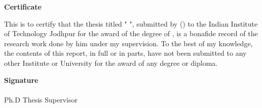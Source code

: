 \setmainfont[ Path = font/,
 BoldFont={CandaraBI}, 
 ItalicFont={booki},
 BoldItalicFont={bookbi}
 ]{bookr}


 


\begin{flushright}
\huge{\textbf{Certificate}}
\end{flushright}
  This is to certify that the thesis titled " \emph{\ttitle{}} ", submitted by \authorname{} (\rn{}) to the Indian Institute of Technology Jodhpur for the award of the degree of \degree{}, is a bonafide record of the research work done by him under my supervision. To the best of my knowledge, the contents of this report, in full or in parts, have not been submitted to any other Institute or University for the award of any degree or diploma.
\vspace{2cm}
\begin{flushright}
\large{\textbf{Signature}}\\
\supname\\
Ph.D Thesis Supervisor 
\end{flushright}